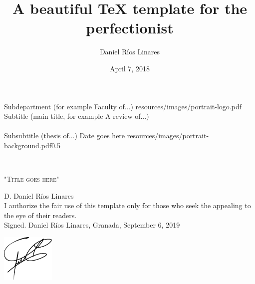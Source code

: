 \documentclass[11pt,openright,a4paper,english]{book} %
\title{A beautiful TeX template for the perfectionist}
\author{Daniel R\'ios Linares}
\date{April 7, 2018}
\begin{document}

\pagestyle{empty}

	{Subdepartment (for example Faculty of...)} %
	{resources/images/portrait-logo.pdf} %
	{\runningtitle} %
	{Subtitle (main title, for example A review of...) \\~\\ Subsubtitle (thesis of...)} %
	{Date goes here} %
	{\runningauthor} %
	{resources/images/portrait-background.pdf}{0.5} %

\cleardoublepage
{}
\thispagestyle{empty}

~\vspace{2cm}

\begin{center}
{\LARGE{"\textsc{Title goes here}"}} \\
\end{center}

\vspace{3cm}

\noindent D. Daniel Ríos Linares \\ 

\noindent I authorize the fair use of this template only for those who seek the appealing to the eye of their readers. \\

\noindent Signed. Daniel Ríos Linares, \hfill Granada, September 6, 2019 \\

\begin{center}
\includegraphics[width = 1in]{resources/images/signature.pdf} 
\end{center}


\cleardoublepage
{}
\end{document}
